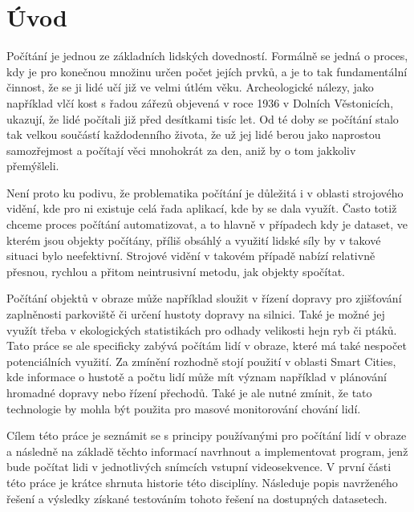 \chapter{Úvod}
\label{sec:Introduction}
Počítání je jednou ze základních lidských dovedností. Formálně se jedná o proces, kdy je pro konečnou množinu určen počet jejích prvků, a je to tak fundamentální činnost, že se ji lidé učí již ve velmi útlém věku.
Archeologické nálezy, jako například vlčí kost s řadou zářezů objevená v roce 1936 v Dolních Věstonicích, ukazují, že lidé počítali již před desítkami tisíc let.
Od té doby se počítání stalo tak velkou součástí každodenního života, že už jej lidé berou jako naprostou samozřejmost a počítají věci mnohokrát za den, aniž by o tom jakkoliv přemýšleli.

Není proto ku podivu, že problematika počítání je důležitá i v oblasti strojového vidění, kde pro ni existuje celá řada aplikací, kde by se dala využít.
Často totiž chceme proces počítání automatizovat, a to hlavně v případech kdy je dataset, ve kterém jsou objekty počítány, příliš obsáhlý a využití lidské síly by v takové situaci bylo neefektivní.
Strojové vidění v takovém případě nabízí relativně přesnou, rychlou a přitom neintrusivní metodu, jak objekty spočítat.

Počítání objektů v obraze může například sloužit v řízení dopravy pro zjišťování zaplněnosti parkoviště či určení hustoty dopravy na silnici. Také je možné jej využít třeba v ekologických statistikách pro odhady velikosti hejn ryb či ptáků.
Tato práce se ale specificky zabývá počítám lidí v obraze, které má také nespočet potenciálních využití.
Za zmínění rozhodně stojí použití v oblasti Smart Cities, kde informace o hustotě a počtu lidí může mít význam například v plánování hromadné dopravy nebo řízení přechodů.
Také je ale nutné zmínit, že tato technologie by mohla být použita pro masové monitorování chování lidí.

Cílem této práce je seznámit se s principy používanými pro počítání lidí v obraze a následně na základě těchto informací navrhnout a implementovat program, jenž bude počítat lidi v jednotlivých snímcích vstupní videosekvence.
V první části této práce je krátce shrnuta historie této disciplíny. Následuje popis navrženého řešení a  výsledky získané testováním tohoto řešení na dostupných datasetech.

\endinput